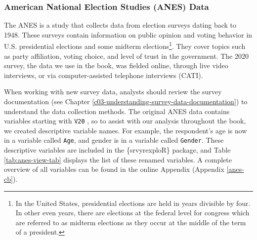 \documentclass[
]{krantz}
\begin{document}
\hypertarget{american-national-election-studies-anes-data}{%
\subsubsection*{American National Election Studies (ANES) Data}\label{american-national-election-studies-anes-data}}


The ANES is a study that collects data from election surveys dating back to 1948. These surveys contain information on public opinion and voting behavior in U.S. presidential elections and some midterm elections\footnote{In the United States, presidential elections are held in years divisible by four. In other even years, there are elections at the federal level for congress which are referred to as midterm elections as they occur at the middle of the term of a president.}. They cover topics such as party affiliation, voting choice, and level of trust in the government. The 2020 survey, the data we use in the book, was fielded online, through live video interviews, or via computer-assisted telephone interviews (CATI).

When working with new survey data, analysts should review the survey documentation (see Chapter \ref{c03-understanding-survey-data-documentation}) to understand the data collection methods. The original ANES data contains variables starting with \texttt{V20} \citep{debell}, so to assist with our analysis throughout the book, we created descriptive variable names. For example, the respondent's age is now in a variable called \texttt{Age}, and gender is in a variable called \texttt{Gender}. These descriptive variables are included in the \{srvyrexploR\} package, and Table \ref{tab:anes-view-tab} displays the list of these renamed variables. A complete overview of all variables can be found in the online Appendix (Appendix \ref{anes-cb}).
\end{document}

